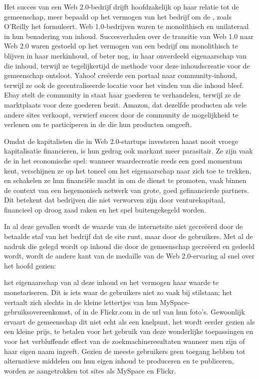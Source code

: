 {Het succes van een Web 2.0{}-bedrijf drijft hoofdzakelijk op haar
relatie tot de gemeenschap, meer bepaald op het vermogen van het
bedrijf om de , zoals O'Reilly
het formuleert. Web 1.0{}-bedrijven waren te monolithisch en
unilateraal in hun benadering van inhoud. Succesverhalen over de
transitie van Web 1.0 naar Web 2.0 waren gestoeld op het vermogen van
een bedrijf om monolithisch te blijven in haar merkinhoud, of beter
nog, in haar onverdeeld eigenaarschap van die inhoud, terwijl ze
tegelijkertijd de methode voor deze inhoudscreatie voor de gemeenschap
ontsloot. Yahoo! cre\"eerde een portaal naar community{}-inhoud,
terwijl ze ook de gecentraliseerde locatie voor het vinden van die
inhoud bleef. Ebay stelt de community in staat haar goederen te
verhandelen, terwijl ze de marktplaats voor deze goederen bezit.
Amazon, dat dezelfde producten als vele andere sites verkoopt, verwierf
succes door de community de mogelijkheid te verlenen om te participeren
in de {\em {}} die hun producten omgeeft.

Omdat de kapitalisten die in Web 2.0{}-startups investeren haast nooit
vroege kapitalisatie financieren, is hun gedrag ook markant meer
parasitair. Ze zijn vaak de  in het economische spel:
wanneer waardecreatie reeds een goed momentum kent, verschijnen ze op
het toneel om het eigenaarschap naar zich toe te trekken, en schakelen
ze hun financi\"ele macht in om de dienst te promoten, vaak binnen de
context van een hegemonisch netwerk van grote, goed gefinancierde
partners. Dit betekent dat bedrijven die niet verworven zijn door
venturekapitaal, financieel op droog zaad raken en het spel
buitengekegeld worden.

In al deze gevallen wordt de waarde van de internetsite niet gecre\"eerd
door de betaalde staf van het bedrijf dat de site runt, maar door de
gebruikers. Met al de nadruk die gelegd wordt op inhoud die door de
gemeenschap gecre\"eerd en gedeeld wordt, wordt de andere kant van de
medaille van de Web 2.0{}-ervaring al snel over het hoofd gezien: 

het eigenaarschap van al deze inhoud en het vermogen haar waarde te
monetariseren. Dit is iets waar de gebruikers niet zo vaak bij
stilstaan; het vertaalt zich slechts in de kleine lettertjes van hun
MySpace{}-gebruiksovereenkomst, of in de Flickr.com in de url van hun
foto's. Gewoonlijk ervaart de gemeenschap dit niet echt als een
knelpunt, het wordt eerder gezien als een kleine prijs, te betalen voor
het gebruik van deze wonderlijke toepassingen en voor het verbluffende
effect van de zoekmachineresultaten wanneer men zijn of haar eigen naam
ingeeft. Gezien de meeste gebruikers geen toegang hebben tot
alternatieve middelen om hun eigen inhoud te produceren en te
publiceren, worden ze aangetrokken tot sites als MySpace en Flickr.

}

